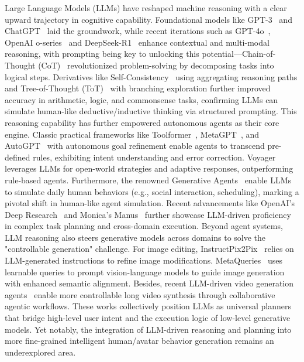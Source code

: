  Large Language Models (LLMs) have reshaped machine reasoning with a clear upward trajectory in cognitive capability. Foundational models like GPT-3~\cite{brown2020language} and ChatGPT~\cite{ouyang2022training, achiam2023gpt} laid the groundwork, while recent iterations such as GPT-4o~\cite{hurst2024gpt}, OpenAI o-series~\cite{jaech2024openai} and DeepSeek-R1~\cite{guo2025deepseek} enhance contextual and multi-modal reasoning, with prompting being key to unlocking this potential—Chain-of-Thought (CoT)~\cite{wei2022chain} revolutionized problem-solving by decomposing tasks into logical steps. Derivatives like Self-Consistency~\cite{wangself} using aggregating reasoning paths and Tree-of-Thought (ToT)~\cite{yao2023tree} with branching exploration further improved accuracy in arithmetic, logic, and commonsense tasks, confirming LLMs can simulate human-like deductive/inductive thinking via structured prompting. 
This reasoning capability has further empowered autonomous agents as their core engine. Classic practical frameworks like Toolformer~\cite{schick2023toolformer}, MetaGPT~\cite{hong2023metagpt}, and AutoGPT~\cite{zhang2023autogpt} with autonomous goal refinement enable agents to transcend pre-defined rules, exhibiting intent understanding and error correction. Voyager~\cite{wang2023voyager} leverages LLMs for open-world strategies and adaptive responses, outperforming rule-based agents. Furthermore, the renowned Generative Agents~\cite{park2023generative} enable LLMs to simulate daily human behaviors (e.g., social interaction, scheduling), marking a pivotal shift in human-like agent simulation. Recent advancements like OpenAI's Deep Research~\cite{openai2025deepresearch} and Monica's Manus~\cite{monica2025manus} further showcase LLM-driven proficiency in complex task planning and cross-domain execution.
Beyond agent systems, LLM reasoning also steers generative models across domains to solve the "controllable generation" challenge. For image editing, InstructPix2Pix~\cite{brooks2023instructpix2pix} relies on LLM-generated instructions to refine image modifications. MetaQueries~\cite{pan2025transfer} uses learnable queries to prompt vision-language models to guide image generation with enhanced semantic alignment. Besides, recent LLM-driven video generation agents~\cite{hu2024storyagent, yuan2024mora, li2024anim, wu2025automated} enable more controllable long video synthesis through collaborative agentic workflows. These works collectively position LLMs as universal planners that bridge high-level user intent and the execution logic of low-level generative models. Yet notably, the integration of LLM-driven reasoning and planning into more fine-grained intelligent human/avatar behavior generation remains an underexplored area.
